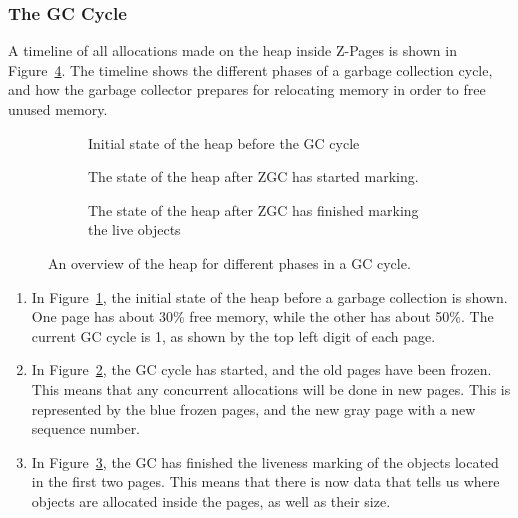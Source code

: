 \subsubsection{The GC Cycle}
\label{background:relocation}
A timeline of all allocations made on the heap inside Z-Pages is shown in Figure~\ref{fig:zgc_timeline}. The timeline shows the different phases of a garbage collection cycle, and how the garbage collector prepares for relocating memory in order to free unused memory.

\begin{figure}[H]
    \centering
    \begin{subfigure}[t]{.214\textwidth}
        \centering
        
        \caption{Initial state of the heap before the GC cycle}
        \label{fig:zrel1}
    \end{subfigure}%
    \hfill\vline\hfill
    \begin{subfigure}[t]{.32\textwidth}
        \centering
        
        \caption{The state of the heap after ZGC has started marking.}
        \label{fig:zrel2}
    \end{subfigure}%
    \hfill\vline\hfill
    \begin{subfigure}[t]{.32\textwidth}
        \centering
        
        \caption{The state of the heap after ZGC has finished marking the live objects}
        \label{fig:zrel3}
    \end{subfigure}%
    \caption{An overview of the heap for different phases in a GC cycle.}
    \label{fig:zgc_timeline}
\end{figure}

\begin{enumerate}
    \item In Figure~\ref*{fig:zrel1}, the initial state of the heap before a garbage collection is shown. One page has about 30\% free memory, while the other has about 50\%. The current GC cycle is 1, as shown by the top left digit of each page.
    \item In Figure~\ref*{fig:zrel2}, the GC cycle has started, and the old pages have been frozen. This means that any concurrent allocations will be done in new pages. This is represented by the blue frozen pages, and the new gray page with a new sequence number.
    \item In Figure~\ref*{fig:zrel3}, the GC has finished the liveness marking of the objects located in the first two pages. This means that there is now data that tells us where objects are allocated inside the pages, as well as their size.
\end{enumerate}

